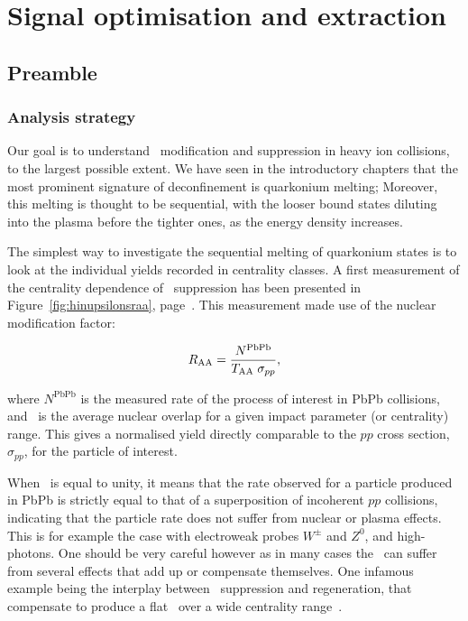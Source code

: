 \chapter{Signal optimisation and extraction}
\label{chap:ayield}
\minitoc
{}


\section{Preamble}
\label{sec:preamble}
\subsection{Analysis strategy}
\label{subsec:strategy}
Our goal is to understand \PgU\ modification and
suppression in heavy ion collisions, to the largest possible extent. We have
seen in the introductory chapters that the most prominent signature of
deconfinement is quarkonium melting; Moreover, this melting is
thought to be sequential, with the looser bound states diluting into
the plasma before the tighter ones, as the energy density increases.


The simplest way to investigate the sequential melting of quarkonium
states is to look at the individual yields recorded in centrality
classes. A first measurement of the centrality dependence of \PgU\ suppression has been presented in
Figure~\ref{fig:hinupsilonsraa}, page~\pageref{fig:hinupsilonsraa}. This
measurement made use of the nuclear modification factor:

\begin{equation}
R_{\rm AA} = \frac{N^{\textrm{PbPb}}}{T_{\rm AA} \; \sigma_{pp}},
\label{eq:raa1}
\end{equation}  

where $N^{\textrm{PbPb}}$ is the measured rate of the process of interest in
PbPb collisions, and \TAA\ is the average nuclear overlap for a given impact parameter (or centrality) range. This gives a
normalised yield directly comparable to the $pp$ cross section, $\sigma_{pp}$,  for the particle of interest.

When \RAA\ is equal to unity, it means that the rate
observed for a particle produced in PbPb is strictly equal to that of a superposition of incoherent $pp$ collisions, indicating that the particle rate does not suffer from
nuclear or plasma effects. This is for example the case with electroweak probes
$W^{\pm}$ and $Z^{0}$, and high-\pt photons. One should be very
careful however as in many cases the \RAA\ can suffer from
several effects that add up or compensate themselves. 
One infamous example
being the interplay between \Jpsi\ suppression and regeneration,
that compensate to produce a flat \RAA\ over a wide centrality range~\cite{jpsiALICE}.


